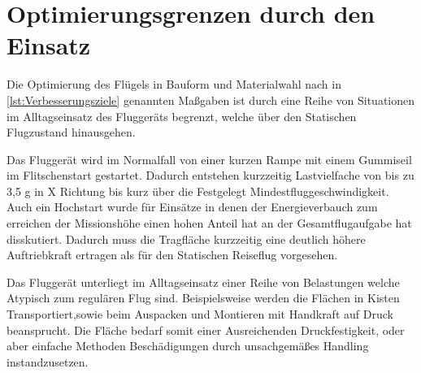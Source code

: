 \section{Optimierungsgrenzen durch den Einsatz}

Die Optimierung des Flügels in Bauform und Materialwahl nach in \ref{lst:Verbesserungsziele} genannten Maßgaben ist durch eine Reihe von Situationen im Alltagseinsatz des Fluggeräts begrenzt, welche über den Statischen Flugzustand hinausgehen.

Das Fluggerät wird im Normalfall von einer kurzen Rampe mit einem Gummiseil im Flitschenstart gestartet. Dadurch entstehen kurzzeitig Lastvielfache von bis zu 3,5 g in X Richtung bis kurz über die Festgelegt Mindestfluggeschwindigkeit.
Auch ein Hochstart wurde für Einsätze in denen der Energieverbauch zum erreichen der Missionshöhe einen hohen Anteil hat an der Gesamtflugaufgabe hat disskutiert. 
Dadurch muss die Tragfläche kurzzeitig eine deutlich höhere Auftriebkraft ertragen als für den Statischen Reiseflug vorgesehen. 

Das Fluggerät unterliegt im Alltagseinsatz einer Reihe von Belastungen welche Atypisch zum regulären Flug sind. Beispielsweise werden die Flächen in Kisten Transportiert,sowie beim Auspacken und Montieren mit Handkraft auf Druck beansprucht. Die Fläche bedarf somit einer Ausreichenden Druckfestigkeit, oder aber einfache Methoden Beschädigungen durch unsachgemäßes Handling instandzusetzen.